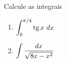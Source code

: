 %
%
%
%
%
%
%
%
%



%
%


\begin{frame}
	\begin{casa}
		Calcule as integrais
\begin{enumerate}
	\item  $\dps\int_0^{\pi/4} \tg x\ dx$
	
	\item $\displaystyle\int\frac{dx}{\sqrt{8x-x^2}}$
		
	
\end{enumerate}
	\end{casa}
	
	
\end{frame}

